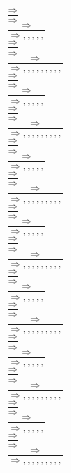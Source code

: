 \documentclass[11pt]{article}
\begin{document}
\begin{center}
\bigskip
\\$\frac{\Rightarrow }{\Rightarrow }$
\bigskip
\\$\frac{\Rightarrow }{\Rightarrow , , , , , }$
\bigskip
\\$\frac{\Rightarrow }{\Rightarrow }$
\bigskip
\\$\frac{\Rightarrow }{\Rightarrow , , , , , , , , , }$
\bigskip
\\$\frac{\Rightarrow }{\Rightarrow }$
\bigskip
\\$\frac{\Rightarrow }{\Rightarrow , , , , , }$
\bigskip
\\$\frac{\Rightarrow }{\Rightarrow }$
\bigskip
\\$\frac{\Rightarrow }{\Rightarrow , , , , , , , , , }$
\bigskip
\\$\frac{\Rightarrow }{\Rightarrow }$
\bigskip
\\$\frac{\Rightarrow }{\Rightarrow , , , , , }$
\bigskip
\\$\frac{\Rightarrow }{\Rightarrow }$
\bigskip
\\$\frac{\Rightarrow }{\Rightarrow , , , , , , , , , }$
\bigskip
\\$\frac{\Rightarrow }{\Rightarrow }$
\bigskip
\\$\frac{\Rightarrow }{\Rightarrow , , , , , }$
\bigskip
\\$\frac{\Rightarrow }{\Rightarrow }$
\bigskip
\\$\frac{\Rightarrow }{\Rightarrow , , , , , , , , , }$
\bigskip
\\$\frac{\Rightarrow }{\Rightarrow }$
\bigskip
\\$\frac{\Rightarrow }{\Rightarrow , , , , , }$
\bigskip
\\$\frac{\Rightarrow }{\Rightarrow }$
\bigskip
\\$\frac{\Rightarrow }{\Rightarrow , , , , , , , , , }$
\bigskip
\\$\frac{\Rightarrow }{\Rightarrow }$
\bigskip
\\$\frac{\Rightarrow }{\Rightarrow , , , , , }$
\bigskip
\\$\frac{\Rightarrow }{\Rightarrow }$
\bigskip
\\$\frac{\Rightarrow }{\Rightarrow , , , , , , , , , }$
\bigskip
\\$\frac{\Rightarrow }{\Rightarrow }$
\bigskip
\\$\frac{\Rightarrow }{\Rightarrow , , , , , }$
\bigskip
\\$\frac{\Rightarrow }{\Rightarrow }$
\bigskip
\\$\frac{\Rightarrow }{\Rightarrow , , , , , , , , , }$

\end{center}
\end{document}

